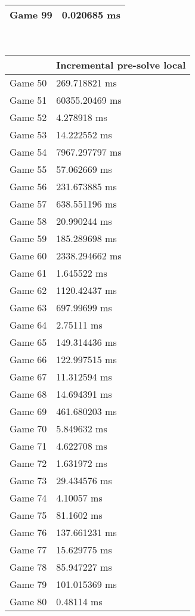 \begin{multicols}{2}
\begin{tabular}{|l|l|}
	Game 99 & 0.020685 ms \\ \hline
\end{tabular}\\
\begin{tabular}{|l|l|}
	\hline
	& Incremental pre-solve local \\ \hline
	Game 50 & 269.718821 ms \\ \hline
	Game 51 & 60355.20469 ms \\ \hline
	Game 52 & 4.278918 ms \\ \hline
	Game 53 & 14.222552 ms \\ \hline
	Game 54 & 7967.297797 ms \\ \hline
	Game 55 & 57.062669 ms \\ \hline
	Game 56 & 231.673885 ms \\ \hline
	Game 57 & 638.551196 ms \\ \hline
	Game 58 & 20.990244 ms \\ \hline
	Game 59 & 185.289698 ms \\ \hline
	Game 60 & 2338.294662 ms \\ \hline
	Game 61 & 1.645522 ms \\ \hline
	Game 62 & 1120.42437 ms \\ \hline
	Game 63 & 697.99699 ms \\ \hline
	Game 64 & 2.75111 ms \\ \hline
	Game 65 & 149.314436 ms \\ \hline
	Game 66 & 122.997515 ms \\ \hline
	Game 67 & 11.312594 ms \\ \hline
	Game 68 & 14.694391 ms \\ \hline
	Game 69 & 461.680203 ms \\ \hline
	Game 70 & 5.849632 ms \\ \hline
	Game 71 & 4.622708 ms \\ \hline
	Game 72 & 1.631972 ms \\ \hline
	Game 73 & 29.434576 ms \\ \hline
	Game 74 & 4.10057 ms \\ \hline
	Game 75 & 81.1602 ms \\ \hline
	Game 76 & 137.661231 ms \\ \hline
	Game 77 & 15.629775 ms \\ \hline
	Game 78 & 85.947227 ms \\ \hline
	Game 79 & 101.015369 ms \\ \hline
	Game 80 & 0.48114 ms \\ \hline

\end{tabular}
\end{multicols}
